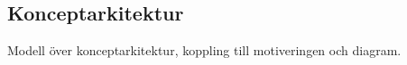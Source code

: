 \subsection{Konceptarkitektur}
Modell över konceptarkitektur, koppling till motiveringen och diagram.